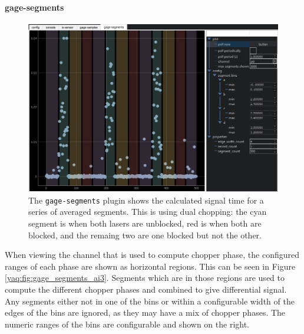 \paragraph{gage-segments}

\begin{landscape}
\begin{figure}
\includegraphics[width=8in]{"yaq/images/gage_segments_ai0"}
\caption[\yaqcqtpy{} Gage DAQ Plugin (segments)]{
	The \texttt{gage-segments} plugin shows the calculated signal time for a series of averaged segments.
	This is using dual chopping: the cyan segment is when both lasers are unblocked, red is when both are blocked, and the remaing two are one blocked but not the other.
}
\label{yaq:fig:gage_segments_ai0}
\end{figure}
\end{landscape}

When viewing the channel that is used to compute chopper phase, the configured ranges of each phase are shown as horizontal regions.
This can be seen in Figure \ref{yaq:fig:gage_segments_ai3}.
Segments which are in those regions are used to compute the different chopper phases and combined to give differential signal.
Any segments either not in one of the bins or within a configurable width of the edges of the bins are ignored, as they may have a mix of chopper phases.
The numeric ranges of the bins are configurable and shown on the right.

